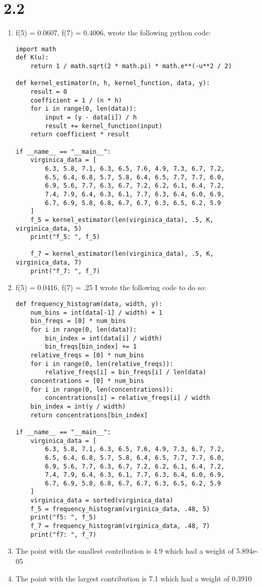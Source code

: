 \documentclass{article}
\begin{document}
\section*{2.2}
\begin{enumerate}
\item f(5) = 0.0607, f(7) = 0.4006, wrote the following python code: \\
\begin{verbatim}
import math
def K(u):
    return 1 / math.sqrt(2 * math.pi) * math.e**(-u**2 / 2) 

def kernel_estimator(n, h, kernel_function, data, y):
    result = 0
    coefficient = 1 / (n * h)
    for i in range(0, len(data)):
        input = (y - data[i]) / h
        result += kernel_function(input)
    return coefficient * result

if __name__ == "__main__":
    virginica_data = [
        6.3, 5.8, 7.1, 6.3, 6.5, 7.6, 4.9, 7.3, 6.7, 7.2,
        6.5, 6.4, 6.8, 5.7, 5.8, 6.4, 6.5, 7.7, 7.7, 6.0,
        6.9, 5.6, 7.7, 6.3, 6.7, 7.2, 6.2, 6.1, 6.4, 7.2,
        7.4, 7.9, 6.4, 6.3, 6.1, 7.7, 6.3, 6.4, 6.0, 6.9,
        6.7, 6.9, 5.8, 6.8, 6.7, 6.7, 6.3, 6.5, 6.2, 5.9
    ]
    f_5 = kernel_estimator(len(virginica_data), .5, K, virginica_data, 5)
    print("f_5: ", f_5)

    f_7 = kernel_estimator(len(virginica_data), .5, K, virginica_data, 7)
    print("f_7: ", f_7)
\end{verbatim}
\item f(5) = 0.0416, f(7) = .25 I wrote the following code to do so: \\
\begin{verbatim}
def frequency_histogram(data, width, y):
    num_bins = int(data[-1] / width) + 1
    bin_freqs = [0] * num_bins
    for i in range(0, len(data)):
        bin_index = int(data[i] / width)
        bin_freqs[bin_index] += 1
    relative_freqs = [0] * num_bins
    for i in range(0, len(relative_freqs)):
        relative_freqs[i] = bin_freqs[i] / len(data)
    concentrations = [0] * num_bins
    for i in range(0, len(concentrations)):
        concentrations[i] = relative_freqs[i] / width
    bin_index = int(y / width)
    return concentrations[bin_index]

if __name__ == "__main__":
    virginica_data = [
        6.3, 5.8, 7.1, 6.3, 6.5, 7.6, 4.9, 7.3, 6.7, 7.2,
        6.5, 6.4, 6.8, 5.7, 5.8, 6.4, 6.5, 7.7, 7.7, 6.0,
        6.9, 5.6, 7.7, 6.3, 6.7, 7.2, 6.2, 6.1, 6.4, 7.2,
        7.4, 7.9, 6.4, 6.3, 6.1, 7.7, 6.3, 6.4, 6.0, 6.9,
        6.7, 6.9, 5.8, 6.8, 6.7, 6.7, 6.3, 6.5, 6.2, 5.9
    ]
    virginica_data = sorted(virginica_data)
    f_5 = frequency_histogram(virginica_data, .48, 5)
    print("f5: ", f_5)
    f_7 = frequency_histogram(virginica_data, .48, 7)
    print("f7: ", f_7)
\end{verbatim}
\item The point with the smallest contribution is 4.9 which had a weight of 5.894e-05 \\
\item The point with the largest contribution is 7.1 which had a weight of 0.3910
\end{enumerate}
\section*{}
\end{document}

